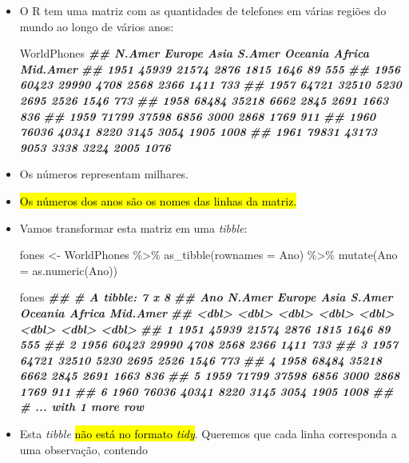 \documentclass[
  11pt]{report}
\newenvironment{Shaded}{\begin{snugshade}}{\end{snugshade}}
\newcommand{\AttributeTok}[1]{\textcolor[rgb]{0.77,0.63,0.00}{#1}}
\newcommand{\DocumentationTok}[1]{\textcolor[rgb]{0.56,0.35,0.01}{\textbf{\textit{#1}}}}
\newcommand{\FunctionTok}[1]{\textcolor[rgb]{0.00,0.00,0.00}{#1}}
\newcommand{\NormalTok}[1]{#1}
\newcommand{\OtherTok}[1]{\textcolor[rgb]{0.56,0.35,0.01}{#1}}
\newcommand{\SpecialCharTok}[1]{\textcolor[rgb]{0.00,0.00,0.00}{#1}}
\newcommand{\StringTok}[1]{\textcolor[rgb]{0.31,0.60,0.02}{#1}}
\renewenvironment{Shaded}{
    \begin{mdframed}[%
      roundcorner=2pt,%
      innerleftmargin=5pt,%
      innerrightmargin=5pt,%
      topline=true,%
      leftline=true,%
      rightline=true,%
      bottomline=true,%
      linewidth=0.5pt,%
      linecolor=black!20,%
      backgroundcolor=black!2,%
      skipabove=2ex,%
      skipbelow=2.5ex%
    ]%
  }
  {
    \end{mdframed}
  }
\begin{document}
\begin{itemize}
\item
  O R tem uma matriz com as quantidades de telefones em várias regiões do mundo ao longo de vários anos:

\begin{Shaded}
\begin{Highlighting}[]
\NormalTok{WorldPhones}
\DocumentationTok{\#\#      N.Amer Europe Asia S.Amer Oceania Africa Mid.Amer}
\DocumentationTok{\#\# 1951  45939  21574 2876   1815    1646     89      555}
\DocumentationTok{\#\# 1956  60423  29990 4708   2568    2366   1411      733}
\DocumentationTok{\#\# 1957  64721  32510 5230   2695    2526   1546      773}
\DocumentationTok{\#\# 1958  68484  35218 6662   2845    2691   1663      836}
\DocumentationTok{\#\# 1959  71799  37598 6856   3000    2868   1769      911}
\DocumentationTok{\#\# 1960  76036  40341 8220   3145    3054   1905     1008}
\DocumentationTok{\#\# 1961  79831  43173 9053   3338    3224   2005     1076}
\end{Highlighting}
\end{Shaded}
\item
  Os números representam milhares.
\item
  {\hl{Os números dos anos são os nomes das linhas da matriz.}}
\item
  Vamos transformar esta matriz em uma \emph{tibble}:

\begin{Shaded}
\begin{Highlighting}[]
\NormalTok{fones }\OtherTok{\textless{}{-}}\NormalTok{ WorldPhones }\SpecialCharTok{\%\textgreater{}\%} 
  \FunctionTok{as\_tibble}\NormalTok{(}\AttributeTok{rownames =} \StringTok{\textquotesingle{}Ano\textquotesingle{}}\NormalTok{) }\SpecialCharTok{\%\textgreater{}\%} 
  \FunctionTok{mutate}\NormalTok{(}\AttributeTok{Ano =} \FunctionTok{as.numeric}\NormalTok{(Ano))}

\NormalTok{fones}
\DocumentationTok{\#\# \# A tibble: 7 x 8}
\DocumentationTok{\#\#     Ano N.Amer Europe  Asia S.Amer Oceania Africa Mid.Amer}
\DocumentationTok{\#\#   \textless{}dbl\textgreater{}  \textless{}dbl\textgreater{}  \textless{}dbl\textgreater{} \textless{}dbl\textgreater{}  \textless{}dbl\textgreater{}   \textless{}dbl\textgreater{}  \textless{}dbl\textgreater{}    \textless{}dbl\textgreater{}}
\DocumentationTok{\#\# 1  1951  45939  21574  2876   1815    1646     89      555}
\DocumentationTok{\#\# 2  1956  60423  29990  4708   2568    2366   1411      733}
\DocumentationTok{\#\# 3  1957  64721  32510  5230   2695    2526   1546      773}
\DocumentationTok{\#\# 4  1958  68484  35218  6662   2845    2691   1663      836}
\DocumentationTok{\#\# 5  1959  71799  37598  6856   3000    2868   1769      911}
\DocumentationTok{\#\# 6  1960  76036  40341  8220   3145    3054   1905     1008}
\DocumentationTok{\#\# \# ... with 1 more row}
\end{Highlighting}
\end{Shaded}
\item
  Esta \emph{tibble} {\hl{não está no formato \emph{tidy}}}. Queremos que cada linha corresponda a uma observação, contendo


\end{itemize}
\end{document}
